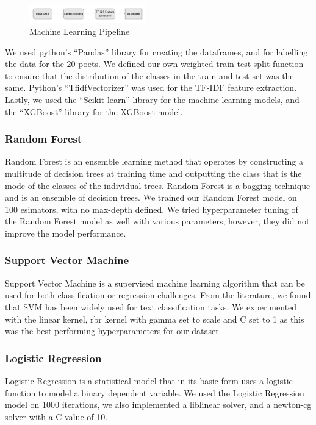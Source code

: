 \begin{figure}[H]
    \centering
    \includegraphics[width=0.45\textwidth]{ml_pipe.png}
    \caption{Machine Learning Pipeline}
\end{figure}

We used python's ``Pandas'' library for creating the dataframes, and for labelling the data for the 20 poets. We defined our own weighted train-test split function to ensure that the distribution of the classes in the train and test set was the same. Python's ``TfidfVectorizer'' was used for the TF-IDF feature extraction. Lastly, we used the ``Scikit-learn'' library for the machine learning models, and the ``XGBoost'' library for the XGBoost model.

\subsubsection{Random Forest}
Random Forest is an ensemble learning method that operates by constructing a multitude of decision trees at training time and outputting the class that is the mode of the classes of the individual trees. Random Forest is a bagging technique and is an ensemble of decision trees. We trained our Random Forest model on 100 esimators, with no max-depth defined. We tried hyperparameter tuning of the Random Forest model as well with various parameters, however, they did not improve the model performance. 

\subsubsection{Support Vector Machine}
Support Vector Machine is a supervised machine learning algorithm that can be used for both classification or regression challenges. From the literature, we found that SVM has been widely used for text classification tasks. We experimented with the linear kernel, rbr kernel with gamma set to scale and C set to 1 as this was the best performing hyperparameters for our dataset.

\subsubsection{Logistic Regression}
Logistic Regression is a statistical model that in its basic form uses a logistic function to model a binary dependent variable. We used the Logistic Regression model on 1000 iterations, we also implemented a liblinear solver, and a newton-cg solver with a C value of 10. 


